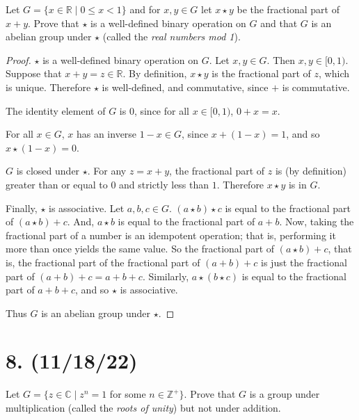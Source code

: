 \documentclass{article}
\begin{document}
Let $G = \{x \in \mathbb{R} \mid 0 \leq x < 1\}$ and for $x, y \in G$ let $x \star y$ be the fractional part of $x + y$. Prove that $\star$ is a well-defined binary operation on $G$ and that $G$ is an abelian group under $\star$ (called the \emph{real numbers mod 1}).

\begin{proof}
      $\star$ is a well-defined binary operation on $G$. Let $x, y \in G$. Then $x, y \in [0, 1)$. Suppose that $x + y = z \in \mathbb{R}$. By definition, $x \star y$ is the fractional part of $z$, which is unique. Therefore $\star$ is well-defined, and commutative, since $+$ is commutative.

      The identity element of $G$ is $0$, since for all $x \in [0, 1)$, $0 + x = x$.

      For all $x \in G$, $x$ has an inverse $1-x \in G$, since $x + (1-x) = 1$, and so $x \star (1-x) = 0$.

      $G$ is closed under $\star$. For any $z = x + y$, the fractional part of $z$ is (by definition) greater than or equal to $0$ and strictly less than $1$. Therefore $x \star y$ is in $G$.

      Finally, $\star$ is associative. Let $a, b, c \in G$. $(a \star b) \star c$ is equal to the fractional part of $(a \star b) + c$. And, $a \star b$ is equal to the fractional part of $a + b$. Now, taking the fractional part of a number is an idempotent operation; that is, performing it more than once yields the same value. So the fractional part of $(a \star b) + c$, that is, the fractional part of the fractional part of $(a + b) + c$ is just the fractional part of $(a + b) + c = a + b + c$. Similarly, $a \star (b \star c)$ is equal to the fractional part of $a + b + c$, and so $\star$ is associative.

      Thus $G$ is an abelian group under $\star$.
\end{proof}

\section*{8. (11/18/22)}

Let $G = \{z \in \mathbb{C} \mid z^n = 1$ for some $n \in \mathbb{Z}^+\}$. Prove that $G$ is a group under multiplication (called the \emph{roots of unity}) but not under addition.
\end{document}
